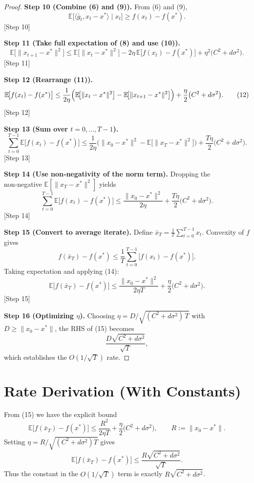 \documentclass{article}
\newcommand{\EE}{\mathbb{E}}
\begin{document}
\begin{proof}
\textbf{Step 10 (Combine (6) and (9)).}  
From (6) and (9),
\[
\EE\!\bigl[\langle\bar g_t,x_t-x^{*}\rangle\mid x_t\bigr]
\ge f(x_t)-f(x^{*}). \tag{10}
\] 
[Step 10]

\textbf{Step 11 (Take full expectation of (8) and use (10)).}
\[
\EE\!\bigl[\|x_{t+1}-x^{*}\|^{2}\bigr]
\le \EE\!\bigl[\|x_t-x^{*}\|^{2}\bigr]
-2\eta\,\EE\!\bigl[f(x_t)-f(x^{*})\bigr]
+\eta^{2}\bigl(C^{2}+d\sigma^{2}\bigr). \tag{11}
\] 
[Step 11]

\textbf{Step 12 (Rearrange (11)).}
\[
\EE\!\bigl[f(x_t)-f(x^{*})\bigr]
\le \frac{1}{2\eta}
\Bigl(\EE\!\bigl[\|x_t-x^{*}\|^{2}\bigr]
      -\EE\!\bigl[\|x_{t+1}-x^{*}\|^{2}\bigr]\Bigr)
+\frac{\eta}{2}\bigl(C^{2}+d\sigma^{2}\bigr). \tag{12}
\] 
[Step 12]

\textbf{Step 13 (Sum over $t=0,\dots,T-1$).}
\[
\sum_{t=0}^{T-1}\EE\!\bigl[f(x_t)-f(x^{*})\bigr]
\le \frac{1}{2\eta}\bigl(\|x_0-x^{*}\|^{2}
      -\EE\!\bigl[\|x_T-x^{*}\|^{2}\bigr]\bigr)
+\frac{T\eta}{2}\bigl(C^{2}+d\sigma^{2}\bigr). \tag{13}
\] 
[Step 13]

\textbf{Step 14 (Use non‑negativity of the norm term).}
Dropping the non‑negative $\EE[\|x_T-x^{*}\|^{2}]$ yields
\[
\sum_{t=0}^{T-1}\EE\!\bigl[f(x_t)-f(x^{*})\bigr]
\le \frac{\|x_0-x^{*}\|^{2}}{2\eta}
+\frac{T\eta}{2}\bigl(C^{2}+d\sigma^{2}\bigr). \tag{14}
\] 
[Step 14]

\textbf{Step 15 (Convert to average iterate).}  
Define $\bar x_T=\frac{1}{T}\sum_{t=0}^{T-1}x_t$.
Convexity of $f$ gives
\[
f(\bar x_T)-f(x^{*})\le\frac{1}{T}\sum_{t=0}^{T-1}\bigl[f(x_t)-f(x^{*})\bigr].
\] 
Taking expectation and applying (14):
\[
\EE\!\bigl[f(\bar x_T)-f(x^{*})\bigr]
\le \frac{\|x_0-x^{*}\|^{2}}{2\eta T}
+\frac{\eta}{2}\bigl(C^{2}+d\sigma^{2}\bigr). \tag{15}
\] 
[Step 15]

\textbf{Step 16 (Optimizing $\eta$).}  
Choosing $\eta=D/\sqrt{(C^{2}+d\sigma^{2})\,T}$ with $D\ge\|x_0-x^{*}\|$,
the RHS of (15) becomes
\[
\frac{D\sqrt{C^{2}+d\sigma^{2}}}{\sqrt{T}},
\]
which establishes the $O(1/\sqrt{T})$ rate. \qedhere
\end{proof}

\section*{Rate Derivation (With Constants)}
From (15) we have the explicit bound
\[
\boxed{
\EE\!\bigl[f(\bar x_T)-f(x^{*})\bigr]
\le
\frac{R^{2}}{2\eta T}
+\frac{\eta}{2}\bigl(C^{2}+d\sigma^{2}\bigr)},
\qquad R:=\|x_0-x^{*}\|.
\]
Setting $\eta=R/\sqrt{(C^{2}+d\sigma^{2})T}$ gives
\[
\EE\!\bigl[f(\bar x_T)-f(x^{*})\bigr]
\le
\frac{R\sqrt{C^{2}+d\sigma^{2}}}{\sqrt{T}}.
\]
Thus the constant in the $O(1/\sqrt{T})$ term is exactly $R\sqrt{C^{2}+d\sigma^{2}}$.
\end{document}
